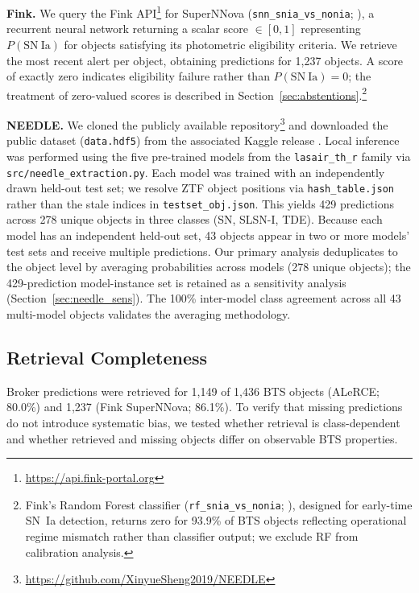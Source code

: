 \documentclass[twocolumn]{aastex631}
\begin{document}
\textbf{Fink.} We query the Fink
API\footnote{\url{https://api.fink-portal.org}} for SuperNNova
(\texttt{snn\_snia\_vs\_nonia}; \citealt{moller2020}), a recurrent
neural network returning a scalar score $\in [0,1]$ representing
$P(\mathrm{SN~Ia})$ for objects satisfying its photometric
eligibility criteria. We retrieve the most recent alert per object,
obtaining predictions for 1,237 objects. A score of exactly zero
indicates eligibility failure rather than $P(\mathrm{SN~Ia}) = 0$;
the treatment of zero-valued scores is described in
Section~\ref{sec:abstentions}.\footnote{Fink's Random Forest
classifier (\texttt{rf\_snia\_vs\_nonia}; \citealt{leoni2022}),
designed for early-time SN~Ia detection, returns zero for 93.9\%
of BTS objects reflecting operational regime mismatch rather than
classifier output; we exclude RF from calibration analysis.}

\textbf{NEEDLE.} We cloned the publicly available
repository\footnote{\url{https://github.com/XinyueSheng2019/NEEDLE}}
and downloaded the public dataset (\texttt{data.hdf5}) from the
associated Kaggle release \citep{sheng2024}. Local inference was
performed using the five pre-trained models from the
\texttt{lasair\_th\_r} family via \texttt{src/needle\_extraction.py}.
Each model was trained with an independently drawn held-out test
set; we resolve ZTF object positions via \texttt{hash\_table.json}
rather than the stale indices in \texttt{testset\_obj.json}. This
yields 429 predictions across 278 unique objects in three classes
(SN, SLSN-I, TDE). Because each model has an independent held-out
set, 43 objects appear in two or more models' test sets and receive
multiple predictions. Our primary analysis deduplicates to the
object level by averaging probabilities across models (278 unique
objects); the 429-prediction model-instance set is retained as a
sensitivity analysis (Section~\ref{sec:needle_sens}). The 100\%
inter-model class agreement across all 43 multi-model objects
validates the averaging methodology.

\subsection{Retrieval Completeness}\label{sec:retrieval}

Broker predictions were retrieved for 1,149 of 1,436 BTS objects
(ALeRCE; 80.0\%) and 1,237 (Fink SuperNNova; 86.1\%). To verify
that missing predictions do not introduce systematic bias, we
tested whether retrieval is class-dependent and whether retrieved
and missing objects differ on observable BTS properties.
\end{document}
